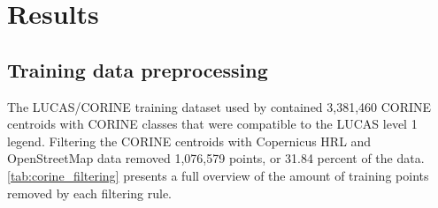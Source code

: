     \begin{table}[H]
        \caption{Summary of S2GLC points per country and LUCAS level 1 class, used to validate the land cover maps of 2017}
        \label{tab:total_s2glc}
    \end{table}
    
\section{Results}

    \subsection{Training data preprocessing}

    The LUCAS/CORINE training dataset used by \citep{witjes2022spatiotemporal} contained 3,381,460 CORINE centroids with CORINE classes that were compatible to the LUCAS level 1 legend. Filtering the CORINE centroids with Copernicus HRL and OpenStreetMap data removed 1,076,579 points, or 31.84 percent of the data. \ref{tab:corine_filtering} presents a full overview of the amount of training points removed by each filtering rule. 

